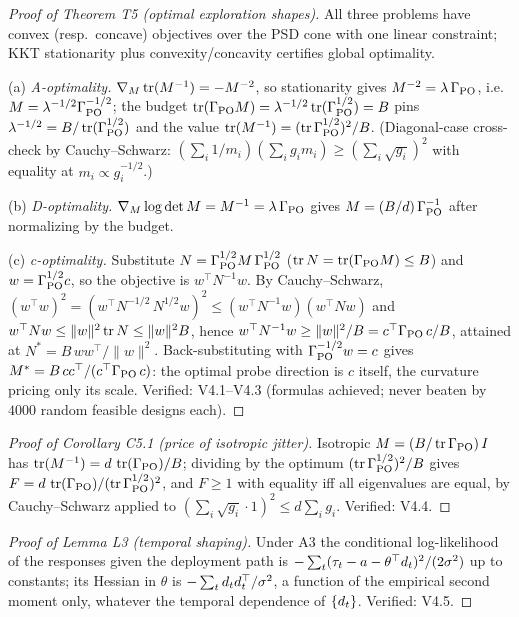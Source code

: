 \documentclass[11pt]{article}
\begin{document}
\begin{proof}[Proof of Theorem T5 (optimal exploration shapes)]
All three problems have convex (resp.\ concave) objectives over the PSD
cone with one linear constraint; KKT stationarity plus
convexity/concavity certifies global optimality.

(a) \emph{A-optimality.} $\nabla_M \operatorname{tr}(M^{-1}) = -M^{-2}$, so stationarity
gives $M^{-2} = \lambda\,\Gamma_{\mathrm{PO}}$, i.e.\ $M = \lambda^{-1/2}\Gamma_{\mathrm{PO}}^{-1/2}$;
the budget $\operatorname{tr}(\Gamma_{\mathrm{PO}} M) = \lambda^{-1/2}\operatorname{tr}(\Gamma_{\mathrm{PO}}^{1/2}) = B$ pins
$\lambda^{-1/2} = B/\operatorname{tr}(\Gamma_{\mathrm{PO}}^{1/2})$ and the value
$\operatorname{tr}(M^{-1}) = (\operatorname{tr} \Gamma_{\mathrm{PO}}^{1/2})^2/B$. (Diagonal-case cross-check by
Cauchy--Schwarz: $(\sum_i 1/m_i)(\sum_i g_i m_i) \ge (\sum_i \sqrt{g_i})^2$
with equality at $m_i \propto g_i^{-1/2}$.)

(b) \emph{D-optimality.} $\nabla_M \log\det M = M^{-1} = \lambda\,\Gamma_{\mathrm{PO}}$
gives $M = (B/d)\,\Gamma_{\mathrm{PO}}^{-1}$ after normalizing by the budget.

(c) \emph{c-optimality.} Substitute $N = \Gamma_{\mathrm{PO}}^{1/2} M\,\Gamma_{\mathrm{PO}}^{1/2}$
($\operatorname{tr} N = \operatorname{tr}(\Gamma_{\mathrm{PO}} M) \le B$) and $w = \Gamma_{\mathrm{PO}}^{1/2} c$, so the objective is
$w^\top N^{-1} w$. By Cauchy--Schwarz,
$(w^\top w)^2 = (w^\top N^{-1/2}\,N^{1/2} w)^2
\le (w^\top N^{-1} w)(w^\top N w)$ and $w^\top N w \le \|w\|^2 \operatorname{tr} N \le
\|w\|^2 B$, hence $w^\top N^{-1} w \ge \|w\|^2/B = c^\top \Gamma_{\mathrm{PO}}\,c/B$,
attained at $N^* = B\,ww^\top/\|w\|^2$. Back-substituting with
$\Gamma_{\mathrm{PO}}^{-1/2}w = c$ gives $M^* = B\,cc^\top/(c^\top\Gamma_{\mathrm{PO}}\,c)$: the optimal
probe direction is $c$ itself, the curvature pricing only its scale.
Verified: V4.1--V4.3 (formulas achieved; never beaten by $4000$ random
feasible designs each).
\end{proof}

\begin{proof}[Proof of Corollary C5.1 (price of isotropic jitter)]
Isotropic $M = (B/\operatorname{tr}\Gamma_{\mathrm{PO}})\,I$ has $\operatorname{tr}(M^{-1}) = d\,\operatorname{tr}(\Gamma_{\mathrm{PO}})/B$; dividing
by the optimum $(\operatorname{tr}\Gamma_{\mathrm{PO}}^{1/2})^2/B$ gives
$F = d\,\operatorname{tr}(\Gamma_{\mathrm{PO}})/(\operatorname{tr}\Gamma_{\mathrm{PO}}^{1/2})^2$, and $F \ge 1$ with equality iff all
eigenvalues are equal, by Cauchy--Schwarz applied to
$(\sum_i \sqrt{g_i}\cdot 1)^2 \le d \sum_i g_i$. Verified: V4.4.
\end{proof}

\begin{proof}[Proof of Lemma L3 (temporal shaping)]
Under A3 the conditional log-likelihood of the responses given the
deployment path is $-\sum_t (\tau_t - a - \theta^\top d_t)^2/(2\sigma^2)$
up to constants; its Hessian in $\theta$ is $-\sum_t d_t
d_t^\top/\sigma^2$, a function of the empirical second moment only,
whatever the temporal dependence of $\{d_t\}$. Verified: V4.5.
\end{proof}
\end{document}
